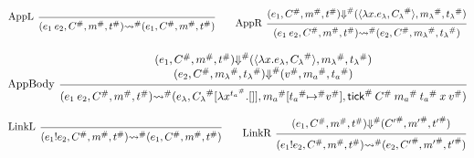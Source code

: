 \documentclass[acmsmall,screen,review]{acmart}
\theoremstyle{definition}
\newcommand*{\A}[1]{{#1}^{\#}}
\newcommand*{\mem}{m}
\newcommand*{\link}[2]{{#1}\mathtt{!}{#2}}
\newcommand*{\tick}{\mathsf{tick}}
\begin{document}
\begin{figure}[htb]
  \centering
  \footnotesize
  \[
    \begin{prooftree}
      \infer[left label={AppL}]0{
      (e_{1}\:e_{2}, \A{C}, \A{\mem}, \A{t})
      \A\rightsquigarrow
      (e_{1}, \A{C}, \A{\mem}, \A{t})
      }
    \end{prooftree}\qquad
    \begin{prooftree}
      \hypo{
        \begin{matrix}
          (e_{1}, \A{C}, \A{\mem}, \A{t})
          \A{\Downarrow}
          (\langle\lambda x.e_{\lambda}, \A{C_{\lambda}}\rangle, \A{\mem_{\lambda}}, \A{t_{\lambda}})
        \end{matrix}
      }
      \infer[left label={AppR}]1{
      (e_{1}\:e_{2}, \A{C}, \A{\mem}, \A{t})
      \A\rightsquigarrow
      (e_{2}, \A{C}, \A{\mem_{\lambda}}, \A{t_{\lambda}})
      }
    \end{prooftree}
  \]

  \[
    \begin{prooftree}
      \hypo{
        \begin{matrix}
          (e_{1}, \A{C}, \A{\mem}, \A{t})
          \A{\Downarrow}
          (\langle\lambda x.e_{\lambda}, \A{C_{\lambda}}\rangle, \A{\mem_{\lambda}}, \A{t_{\lambda}}) \\
          (e_{2}, \A{C}, \A{\mem_{\lambda}}, \A{t_{\lambda}})
          \A{\Downarrow}
          (\A{v}, \A{\mem_{a}}, \A{t_{a}})
        \end{matrix}
      }
      \infer[left label={AppBody}]1{
      (e_{1}\:e_{2}, \A{C}, \A{\mem}, \A{t})
      \A\rightsquigarrow
      (e_{\lambda}, \A{C_{\lambda}}[\lambda x^{\A{t_{a}}}.[]], \A{\mem_{a}}[\A{t_{a}}\A{\mapsto} \A{v}], \A{\tick}\:\A{C}\:\A{\mem_a}\:\A{t_{a}}\:x\:\A{v})
      }
    \end{prooftree}
  \]

  \[
    \begin{prooftree}
      \infer[left label=LinkL]0{
      (\link{e_{1}}{e_{2}}, \A{C}, \A{\mem}, \A{t})
      \A\rightsquigarrow
      (e_{1}, \A{C}, \A{\mem}, \A{t})
      }
    \end{prooftree}\qquad
    \begin{prooftree}
      \hypo{
        \begin{matrix}
          (e_{1}, \A{C}, \A{\mem}, \A{t})
          \A{\Downarrow}
          (\A{C'}, \A{\mem'}, \A{t'})
        \end{matrix}
      }
      \infer[left label=LinkR]1{
      (\link{e_{1}}{e_{2}}, \A{C}, \A{\mem}, \A{t})
      \A\rightsquigarrow
      (e_{2}, \A{C'}, \A{\mem'}, \A{t'})
      }
    \end{prooftree}
  \]


\end{figure}
\end{document}
